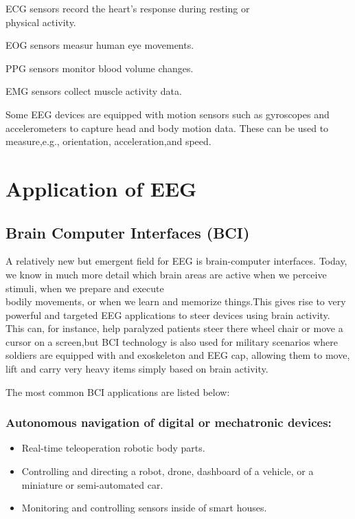 \documentclass[12pt,a4paper]{article}
\begin{document}
ECG  sensors record the heart's response during resting or\\ physical activity.
 
 
 
 EOG sensors measur human eye movements.
 
 
 
 
  PPG sensors monitor blood volume changes.
  
  
   EMG sensors collect muscle activity data.
   
   
\hspace{1cm}
   
   
   Some EEG devices are equipped with motion sensors such as gyroscopes and accelerometers to capture head and body motion data. These can be used to measure,e.g., orientation, acceleration,and speed.


\section{Application of EEG}


\subsection{Brain Computer Interfaces (BCI)}

A relatively new but emergent field for EEG is brain-computer interfaces. Today, we know in much more detail which brain areas are active when we perceive stimuli, when we prepare and execute\\ bodily movements, or when we learn and memorize things.This gives rise to very powerful and targeted EEG applications to steer devices using brain activity. This can, for instance, help paralyzed patients steer there wheel chair or move a cursor on a screen,but BCI technology is also used for military scenarios where soldiers are equipped with and exoskeleton and EEG cap, allowing them to move, lift and carry very heavy items simply based on brain activity.

The most common BCI applications are listed below:

\subsubsection{Autonomous navigation of digital or mechatronic devices:}

\begin{itemize}
\item Real-time teleoperation robotic body parts.
\item Controlling and directing a robot, drone, dashboard of a vehicle, or a miniature or semi-automated car.
\item Monitoring and controlling sensors inside of smart houses.
\end{itemize}
\end{document}
